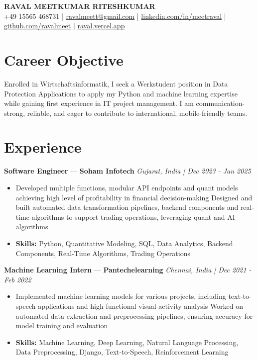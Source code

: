 \documentclass[a4paper,10pt]{article}
\begin{document}
\begin{center}
  {\Large\bfseries RAVAL MEETKUMAR RITESHKUMAR}\\[2pt]
  {\small +49 15565 468731 \;|\; \href{mailto:ravalmeett@gmail.com}{ravalmeett@gmail.com} \;|\; \href{https://www.linkedin.com/in/meetraval/}{linkedin.com/in/meetraval} \;|\; \href{https://github.com/ravalmeet}{github.com/ravalmeet} \;|\; \href{https://raval.vercel.app/}{raval.vercel.app}}
\end{center}
\vspace{-3pt}

\section*{Career Objective}
Enrolled in Wirtschaftsinformatik, I seek a Werkstudent position in Data Protection Applications to apply my Python and machine learning expertise while gaining first experience in IT project management. I am communication-strong, reliable, and eager to contribute to international, mobile-friendly teams.\par

\section*{Experience}
\textbf{Software Engineer} — \textbf{Soham Infotech} \hfill \textit{Gujarat, India \;|\; Dec 2023 - Jan 2025}\par
\vspace{1pt}
\begin{itemize}
  \item Developed multiple functions, modular API endpoints and quant models achieving high level of profitability in financial decision-making Designed and built automated data transformation pipelines, backend components and real-time algorithms to support trading operations, leveraging quant and AI algorithms
  \item \textbf{Skills:} Python, Quantitative Modeling, SQL, Data Analytics, Backend Components, Real-Time Algorithms, Trading Operations
\end{itemize}
\vspace{3pt}
\textbf{Machine Learning Intern} — \textbf{Pantechelearning} \hfill \textit{Chennai, India \;|\; Dec 2021 - Feb 2022}\par
\vspace{1pt}
\begin{itemize}
  \item Implemented machine learning models for various projects, including text-to-speech applications and high functional visual-activity analysis Worked on automated data extraction and preprocessing pipelines, ensuring accuracy for model training and evaluation
  \item \textbf{Skills:} Machine Learning, Deep Learning, Natural Language Processing, Data Preprocessing, Django, Text-to-Speech, Reinforcement Learning
\end{itemize}
\end{document}

